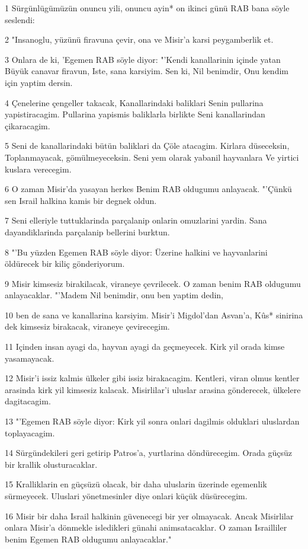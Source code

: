 \par 1 Sürgünlügümüzün onuncu yili, onuncu ayin* on ikinci günü RAB bana söyle seslendi:
\par 2 "Insanoglu, yüzünü firavuna çevir, ona ve Misir'a karsi peygamberlik et.
\par 3 Onlara de ki, 'Egemen RAB söyle diyor: "'Kendi kanallarinin içinde yatan Büyük canavar firavun, Iste, sana karsiyim. Sen ki, Nil benimdir, Onu kendim için yaptim dersin.
\par 4 Çenelerine çengeller takacak, Kanallarindaki baliklari Senin pullarina yapistiracagim. Pullarina yapismis baliklarla birlikte Seni kanallarindan çikaracagim.
\par 5 Seni de kanallarindaki bütün baliklari da Çöle atacagim. Kirlara düseceksin, Toplanmayacak, gömülmeyeceksin. Seni yem olarak yabanil hayvanlara Ve yirtici kuslara verecegim.
\par 6 O zaman Misir'da yasayan herkes Benim RAB oldugumu anlayacak. "'Çünkü sen Israil halkina kamis bir degnek oldun.
\par 7 Seni elleriyle tuttuklarinda parçalanip onlarin omuzlarini yardin. Sana dayandiklarinda parçalanip bellerini burktun.
\par 8 "'Bu yüzden Egemen RAB söyle diyor: Üzerine halkini ve hayvanlarini öldürecek bir kiliç gönderiyorum.
\par 9 Misir kimsesiz birakilacak, viraneye çevrilecek. O zaman benim RAB oldugumu anlayacaklar. "'Madem Nil benimdir, onu ben yaptim dedin,
\par 10 ben de sana ve kanallarina karsiyim. Misir'i Migdol'dan Asvan'a, Kûs* sinirina dek kimsesiz birakacak, viraneye çevirecegim.
\par 11 Içinden insan ayagi da, hayvan ayagi da geçmeyecek. Kirk yil orada kimse yasamayacak.
\par 12 Misir'i issiz kalmis ülkeler gibi issiz birakacagim. Kentleri, viran olmus kentler arasinda kirk yil kimsesiz kalacak. Misirlilar'i uluslar arasina gönderecek, ülkelere dagitacagim.
\par 13 "'Egemen RAB söyle diyor: Kirk yil sonra onlari dagilmis olduklari uluslardan toplayacagim.
\par 14 Sürgündekileri geri getirip Patros'a, yurtlarina döndürecegim. Orada güçsüz bir krallik olusturacaklar.
\par 15 Kralliklarin en güçsüzü olacak, bir daha uluslarin üzerinde egemenlik sürmeyecek. Uluslari yönetmesinler diye onlari küçük düsürecegim.
\par 16 Misir bir daha Israil halkinin güvenecegi bir yer olmayacak. Ancak Misirlilar onlara Misir'a dönmekle isledikleri günahi animsatacaklar. O zaman Israilliler benim Egemen RAB oldugumu anlayacaklar."

